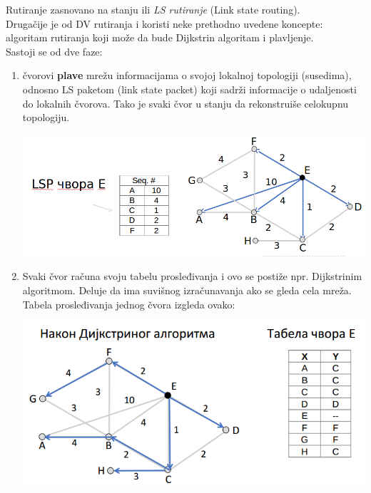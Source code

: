 \documentclass{article} %
\begin{document}
Rutiranje zasnovano na stanju ili \textit{LS rutiranje} (Link state routing).\\
Drugačije je od DV rutiranja i koristi neke prethodno uvedene koncepte: algoritam rutiranja koji može da bude Dijkstrin algoritam i plavljenje.\\
Sastoji se od dve faze:
\begin{enumerate}
  \item čvorovi \textbf{plave} mrežu informacijama o svojoj lokalnoj topologiji (susedima), odnosno LS paketom (link state packet) koji sadrži informacije o udaljenosti do lokalnih čvorova. Tako je svaki čvor u stanju da rekonstruiše celokupnu topologiju.
\begin{center}
	\includegraphics[scale=0.3]{LSP}
\end{center}
  \item Svaki čvor računa svoju tabelu prosleđivanja i ovo se postiže npr. Dijkstrinim algoritmom. Deluje da ima suvišnog izračunavanja ako se gleda cela mreža. Tabela prosleđivanja jednog čvora izgleda ovako:
\begin{center}
	\includegraphics[scale=0.4]{LSP2}
\end{center}
\end{enumerate}
\end{document}
